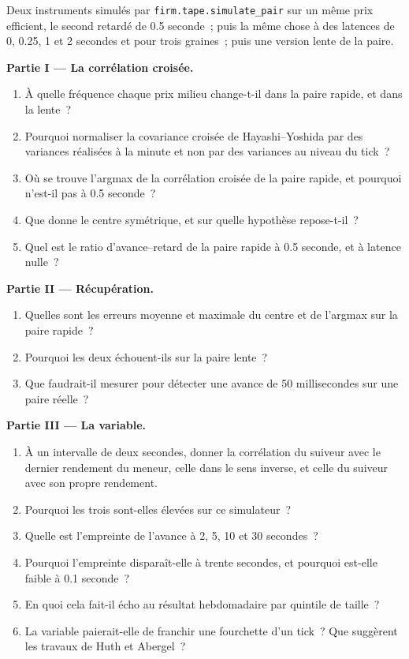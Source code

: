 \begin{problem}\label{pb:rs:cross-sectional-and-cross-asset-features:1}
Deux instruments simulés par \texttt{firm.tape.simulate\_pair} sur un même prix efficient, le second retardé de 0.5 seconde~; puis la
même chose à des latences de 0, 0.25, 1 et 2 secondes et pour trois graines~; puis une version lente de la paire.

\medskip\noindent\textbf{Partie I --- La corrélation croisée.}
\begin{enumerate}
\item À quelle fréquence chaque prix milieu change-t-il dans la paire rapide, et dans la lente~?
\item Pourquoi normaliser la covariance croisée de Hayashi--Yoshida par des variances réalisées à la minute et non par des variances au niveau du tick~?
\item Où se trouve l'argmax de la corrélation croisée de la paire rapide, et pourquoi n'est-il pas à 0.5 seconde~?
\item Que donne le centre symétrique, et sur quelle hypothèse repose-t-il~?
\item Quel est le ratio d'avance--retard de la paire rapide à 0.5 seconde, et à latence nulle~?
\end{enumerate}

\medskip\noindent\textbf{Partie II --- Récupération.}
\begin{enumerate}[resume]
\item Quelles sont les erreurs moyenne et maximale du centre et de l'argmax sur la paire rapide~?
\item Pourquoi les deux échouent-ils sur la paire lente~?
\item Que faudrait-il mesurer pour détecter une avance de 50 millisecondes sur une paire réelle~?
\end{enumerate}

\medskip\noindent\textbf{Partie III --- La variable.}
\begin{enumerate}[resume]
\item À un intervalle de deux secondes, donner la corrélation du suiveur avec le dernier rendement du meneur, celle dans le sens inverse, et celle du suiveur avec son propre rendement.
\item Pourquoi les trois sont-elles élevées sur ce simulateur~?
\item Quelle est l'empreinte de l'avance à 2, 5, 10 et 30 secondes~?
\item Pourquoi l'empreinte disparaît-elle à trente secondes, et pourquoi est-elle faible à 0.1 seconde~?
\item En quoi cela fait-il écho au résultat hebdomadaire par quintile de taille~?
\item La variable paierait-elle de franchir une fourchette d'un tick~? Que suggèrent les travaux de Huth et Abergel~?
\end{enumerate}


\end{problem}
